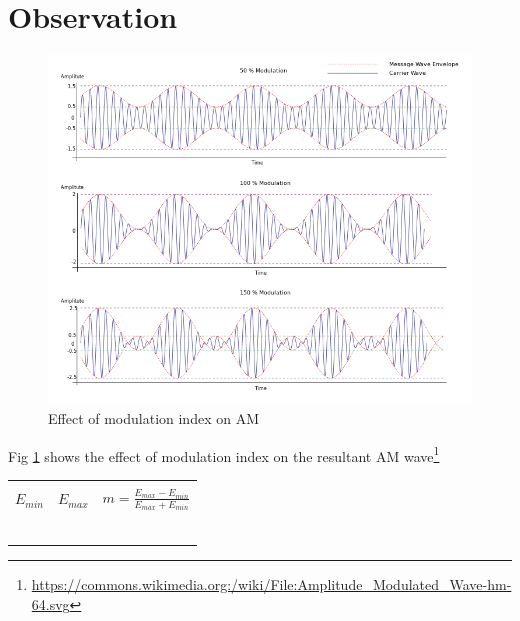 \documentclass{book}
\begin{document}
\section*{Observation}

\begin{figure}[h]

\includegraphics[width=\textwidth]{AMmodindex.png}
\caption{Effect of modulation index on AM}
\label{AMmodindex}
\end{figure}
\noindent Fig \ref{AMmodindex}  shows the effect of modulation index on the resultant AM wave\footnote{\url{https://commons.wikimedia.org:/wiki/File:Amplitude_Modulated_Wave-hm-64.svg}}
\begin{center}

\begin{tabular}{|l|l|l|}

\hline
 & &\\
 
$E_{min}$  & $E_{max}$ & $m=\frac{E_{max}-E_{min}}{E_{max}+E_{min}}$ \\
 & & \\ \hline
 & & \\ \hline
& & \\ \hline
& & \\ \hline
& & \\ \hline
& & \\ \hline

\end{tabular}
\end{center}
\end{document}
